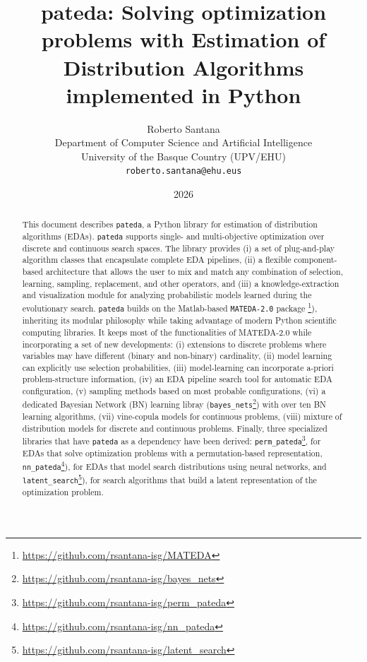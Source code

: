 \documentclass[a4paper,11pt]{article}
\title{%
  \textbf{pateda:  Solving optimization problems with Estimation of Distribution Algorithms implemented in Python}\\[0.5em]
}
\author{
  Roberto Santana\\
  Department of Computer Science and Artificial Intelligence\\
  University of the Basque Country (UPV/EHU)\\
  \texttt{roberto.santana@ehu.eus}
}
\date{2026}
\begin{document}
\maketitle

\begin{abstract}
This document describes \texttt{pateda}, a Python library for  estimation of distribution algorithms (EDAs). \texttt{pateda} supports single- and multi-objective optimization over discrete and continuous search spaces. The library provides (i) a set of plug-and-play algorithm classes that encapsulate complete EDA pipelines, (ii) a flexible component-based architecture that allows the user to mix and match any combination of selection, learning, sampling, replacement, and other operators, and (iii) a knowledge-extraction and visualization module for analyzing probabilistic models learned during the evolutionary search.  \texttt{pateda} builds on the Matlab-based  \texttt{MATEDA-2.0} package \footnote{\url{https://github.com/rsantana-isg/MATEDA}}), inheriting its modular philosophy while taking advantage of modern Python scientific computing libraries. It keeps most of the functionalities of MATEDA-2.0 while incorporating a set of new developments: (i) extensions to discrete problems where variables may have different (binary and non-binary) cardinality, (ii) model learning can explicitly use selection probabilities, (iii) model-learning can incorporate a-priori problem-structure information, (iv)  an EDA pipeline search tool for automatic EDA configuration, (v) sampling methods based on  most probable configurations, (vi) a dedicated Bayesian Network (BN) learning libray (\texttt{bayes\_nets}\footnote{\url{https://github.com/rsantana-isg/bayes_nets}}) with over ten BN learning algorithms, (vii) vine-copula models for continuous problems, (viii) mixture of distribution models for discrete and continuous problems. Finally, three specialized libraries that have \texttt{pateda} as a dependency have been derived:  \texttt{perm\_pateda}\footnote{\url{https://github.com/rsantana-isg/perm_pateda}}, for EDAs that solve optimization problems with a permutation-based representation,  \texttt{nn\_pateda}\footnote{\url{https://github.com/rsantana-isg/nn_pateda}}), for EDAs  that model search distributions using  neural networks, and \texttt{latent\_search}\footnote{\url{https://github.com/rsantana-isg/latent_search}}), for search  algorithms that build a latent representation of the optimization problem.  
\end{abstract}

\tableofcontents
\newpage
\end{document}
